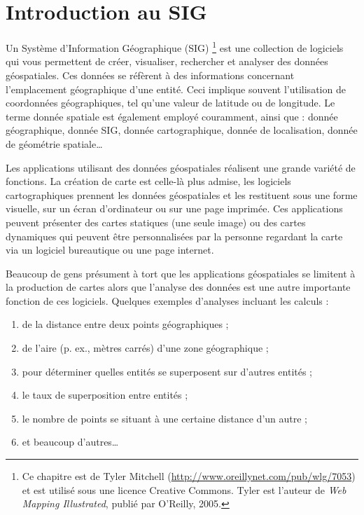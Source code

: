 \pagestyle{scrheadings}
\chapter{Introduction au SIG}\label{label_intro} 

Un Système d'Information Géographique (SIG) \cite{mitchel05}\footnote{Ce chapitre est de Tyler Mitchell (\url{http://www.oreillynet.com/pub/wlg/7053}) et est utilisé sous une licence Creative Commons. Tyler est l'auteur de \textit{Web Mapping Illustrated}, publié par O'Reilly, 2005.} est une collection de logiciels qui vous permettent de créer, visualiser, rechercher et analyser des données géospatiales. Ces données se réfèrent à des informations concernant l'emplacement géographique d'une entité. Ceci implique souvent l'utilisation de coordonnées géographiques, tel qu'une valeur de latitude ou de longitude. Le terme donnée spatiale est également employé couramment, ainsi que : donnée géographique, donnée SIG, donnée cartographique, donnée de localisation, donnée de géométrie spatiale\dots

Les applications utilisant des données géospatiales réalisent une grande variété de fonctions. La création de carte est celle-là plus admise, les logiciels cartographiques prennent les données géospatiales et les restituent sous une forme visuelle, sur un écran d'ordinateur ou sur une page imprimée.
Ces applications peuvent présenter des cartes statiques (une seule image) ou des cartes dynamiques qui peuvent être personnalisées par la personne regardant la carte via un logiciel bureautique ou une page internet.

Beaucoup de gens présument à tort que les applications géospatiales se limitent à la production de cartes alors que l'analyse des données est une autre importante fonction de ces logiciels. Quelques exemples d'analyses incluant les calculs : 

\begin{enumerate} 
\item de la distance entre deux points géographiques  ;
\item de l'aire (p. ex., mètres carrés) d'une zone géographique ;
\item pour déterminer quelles entités se superposent sur d'autres entités ;
\item le taux de superposition entre entités ;
\item le nombre de points se situant à une certaine distance d'un autre ;
\item et beaucoup d'autres\dots
\end{enumerate} 

